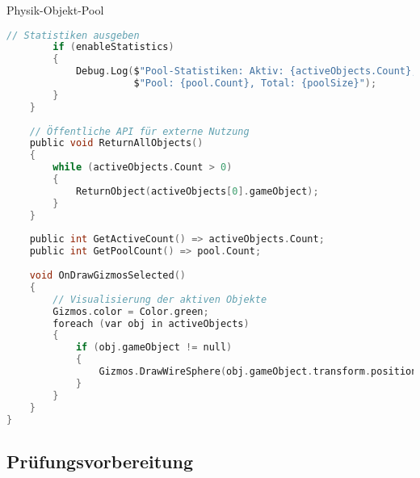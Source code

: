 \begin{code}{Physik-Objekt-Pool}
\begin{lstlisting}[language=C, style=basesmol]
        // Statistiken ausgeben
        if (enableStatistics) 
        {
            Debug.Log($"Pool-Statistiken: Aktiv: {activeObjects.Count}, " +
                      $"Pool: {pool.Count}, Total: {poolSize}");
        }
    }
    
    // Öffentliche API für externe Nutzung
    public void ReturnAllObjects() 
    {
        while (activeObjects.Count > 0) 
        {
            ReturnObject(activeObjects[0].gameObject);
        }
    }
    
    public int GetActiveCount() => activeObjects.Count;
    public int GetPoolCount() => pool.Count;
    
    void OnDrawGizmosSelected() 
    {
        // Visualisierung der aktiven Objekte
        Gizmos.color = Color.green;
        foreach (var obj in activeObjects) 
        {
            if (obj.gameObject != null) 
            {
                Gizmos.DrawWireSphere(obj.gameObject.transform.position, 0.5f);
            }
        }
    }
}
\end{lstlisting}
\end{code}

\subsection{Prüfungsvorbereitung}

